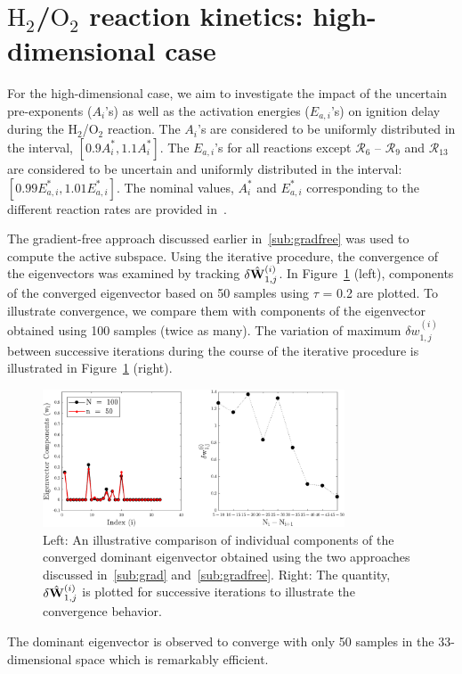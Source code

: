 \section{$\text{H}_2$/$\text{O}_2$ reaction kinetics: high-dimensional case}
\label{sec:app}

For the high-dimensional case, we aim to investigate the impact of the uncertain
pre-exponents ($A_i$'s) as well as the activation energies ($E_{a,i}$'s) on ignition 
delay during the H$_2$/O$_2$ reaction. The $A_i$'s are considered to be uniformly
distributed in the interval, $[0.9A_i^\ast, 1.1A_i^\ast]$. The $E_{a,i}$'s for all
reactions except $\mathcal{R}_6$ -- $\mathcal{R}_9$ and $\mathcal{R}_{13}$
are considered to be uncertain and uniformly distributed in the interval: 
$[0.99E_{a,i}^\ast, 1.01E_{a,i}^\ast]$. The nominal values, $A_i^\ast$ and $E_{a,i}^\ast$
corresponding to the different reaction rates are provided in~\cite{Yetter:1991}. 

The gradient-free approach discussed earlier in~\ref{sub:gradfree} was used to compute the
active subspace. Using the iterative procedure, the convergence of the eigenvectors
was examined by tracking $\delta \hat{\mathbf{{W}}}_{1,j}^{(i)}$. In Figure~\ref{fig:conv_app} (left),
components of the converged eigenvector based on 50 samples using $\tau$ = 0.2 are plotted.
To illustrate convergence, we compare them with components of the eigenvector obtained
using 100 samples (twice as many). The variation of maximum $\delta w_{1,j}^{(i)}$ between
successive iterations during the course of the iterative procedure is illustrated in 
Figure~\ref{fig:conv_app} (right). 
%
\begin{figure}[htbp]
 \begin{center}
  \includegraphics[width=0.8\textwidth]{./Figures/eigv10}
\caption{Left: An illustrative comparison of individual components of the converged dominant eigenvector obtained
using the two approaches discussed in~\ref{sub:grad} and~\ref{sub:gradfree}. Right: The quantity,  $\delta \hat{\mathbf{{W}}}_{1,j}^{(i)}$
is plotted for successive iterations to illustrate the convergence behavior.}
\label{fig:conv_app}
\end{center}
\end{figure}
%
The dominant eigenvector is observed to converge with only 50 samples in the 33-dimensional space which is remarkably efficient. 

